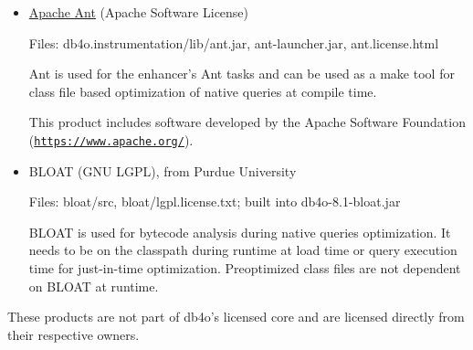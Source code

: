 \begin{itemize}
\item \href{https://ant.apache.org/}{Apache Ant} (Apache Software License)

Files: db4o.instrumentation/lib/ant.jar, ant-launcher.jar, ant.license.html

Ant is used for the enhancer's Ant tasks and can be used as a make tool for class file based optimization of native queries at compile time.

This product includes software developed by the Apache Software Foundation (\href{https://www.apache.org/}{\nolinkurl{https://www.apache.org/}}).
\item BLOAT (GNU LGPL), from Purdue University

Files: bloat/src, bloat/lgpl.license.txt; built into db4o-8.1-bloat.jar

BLOAT is used for bytecode analysis during native queries optimization. It needs to be on the classpath during runtime at load time or query execution time for just-in-time optimization. Preoptimized class files are not dependent on BLOAT at runtime.
\end{itemize}

These products are not part of db4o's licensed core and are licensed directly from their respective owners.
